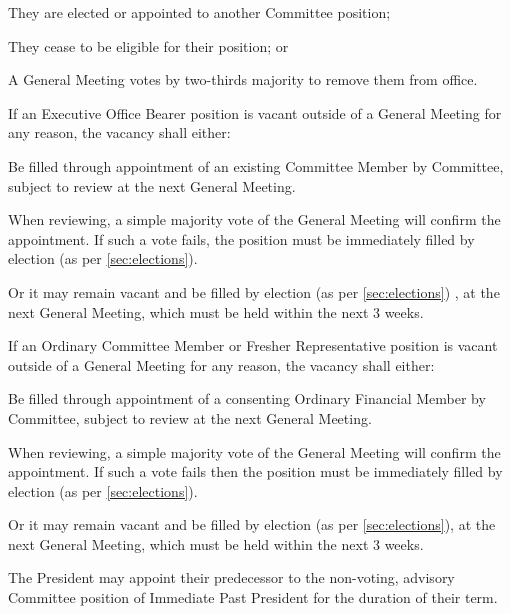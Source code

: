 \documentclass[a4paper]{article}
\begin{document}
\begin{myEnumerate}
\begin{myEnumerate}
            \item They are elected or appointed to another Committee position; 
            \item They cease to be eligible for their position; or
            \item A General Meeting votes by two-thirds majority  to remove them from office.
        \end{myEnumerate}
    \item \label{item:exec_vacancy} If an Executive Office Bearer position is vacant outside of a General Meeting for any reason, the vacancy shall either:
        \begin{myEnumerate}
            \item Be filled through appointment of an existing Committee Member by Committee, subject to review at the next General Meeting.
                \begin{myEnumerate}
                    \item When reviewing, a simple majority vote of the General Meeting will confirm the appointment. If such a vote fails, the position must be immediately filled by election (as per \cref{sec:elections}).
                \end{myEnumerate}
            \item Or it may remain vacant and be filled by election (as per \cref{sec:elections}) , at the next General Meeting, which must be held within the next 3 weeks.
        \end{myEnumerate}
    \item \label{item:ocm_vacancy} If an Ordinary Committee Member or Fresher Representative position is vacant outside of a General Meeting for any reason, the vacancy shall either:
        \begin{myEnumerate}
            \item Be filled through appointment of a consenting Ordinary Financial Member by Committee, subject to review at the next General Meeting.
                \begin{myEnumerate}
                    \item When reviewing, a simple majority vote of the General Meeting will confirm the appointment. If such a vote fails then the position must be immediately filled by election (as per \cref{sec:elections}).
                \end{myEnumerate}
            \item Or it may remain vacant and be filled by election (as per \cref{sec:elections}), at the next General Meeting, which must be held within the next 3 weeks.
        \end{myEnumerate}
    \item The President may appoint their predecessor to the non-voting, advisory Committee position of Immediate Past President for the duration of their term.
\end{myEnumerate}
\end{document}
